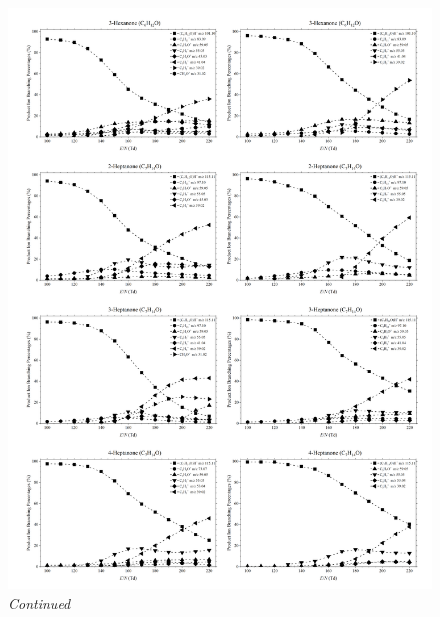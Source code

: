 \begin{figure}\ContinuedFloat
\centering
\includegraphics[width=1\textwidth]{pics/ketones/plot_3.png}
\caption{\textit{Continued}}
\end{figure}
